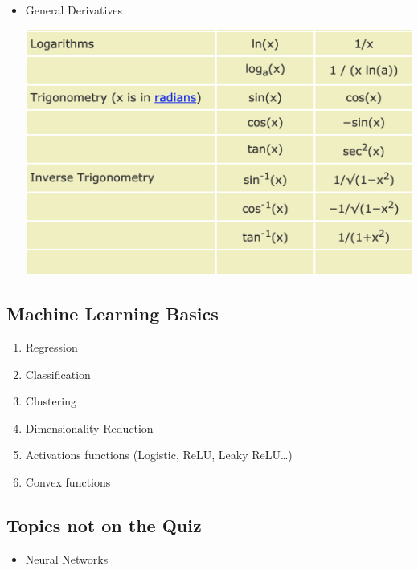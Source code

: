 \documentclass[11pt]{article}
\begin{document}
\begin{itemize}
\item General Derivatives
\begin{center}
\includegraphics[width=.9\linewidth]{./images/derivatives.png}
\end{center}
\end{itemize}

\subsection{Machine Learning Basics}
\label{sec:orgee49312}

\begin{enumerate}
\item Regression
\item Classification
\item Clustering
\item Dimensionality Reduction
\item Activations functions (Logistic, ReLU, Leaky ReLU\ldots{})
\item Convex functions
\end{enumerate}

\subsection{Topics not on the Quiz}
\label{sec:org2064063}

\begin{itemize}
\item Neural Networks
\end{itemize}
\end{document}
